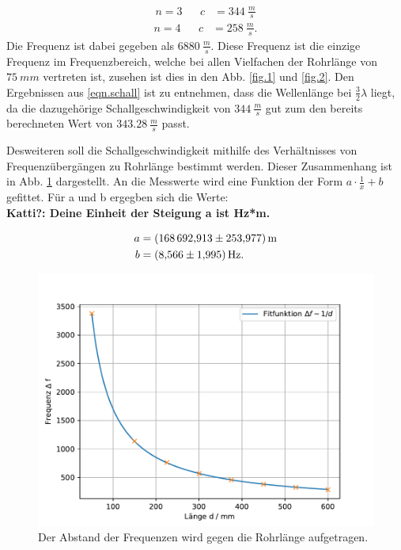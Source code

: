 \begin{align}
  n=3&&  c&=\SI{344}{\frac{m}{s}}
  \label{eqn.schall}
\end{align}
\begin{align*}
  n=4&&  c&=\SI{258}{\frac{m}{s}}.
\end{align*}
Die Frequenz ist dabei gegeben als $\SI{6880}{\frac{m}{s}}$.
Diese Frequenz ist die einzige Frequenz im Frequenzbereich, welche bei allen Vielfachen der Rohrlänge von $\SI{75}{mm}$ vertreten ist,
zusehen ist dies in den Abb. \ref{fig.1} und \ref{fig.2}.
Den Ergebnissen aus \ref{eqn.schall} ist zu entnehmen, dass die Wellenlänge bei $\frac{3}{2}\lambda$ liegt, da die dazugehörige Schallgeschwindigkeit von $\SI{344}{\frac{m}{s}}$ gut zum den bereits berechneten Wert von $\SI{343.28}{\frac{m}{s}}$ passt.

\FloatBarrier
Desweiteren soll die Schallgeschwindigkeit mithilfe des Verhältnisses von Frequenzübergängen zu Rohrlänge bestimmt werden.
Dieser Zusammenhang ist in Abb. \ref{fig.1/x} dargestellt.
An die Messwerte wird eine Funktion der Form $a\cdot\frac{1}{x}+b$ gefittet.
Für a und b ergegben sich die Werte:
\\\textbf{\huge{Katti?: Deine Einheit der Steigung a ist Hz*m.}}

\begin{align*}
  a&=\SI{168692.913\pm253.977}{m}\\
  b&=\SI{8.566\pm1.995}{Hz}.\\
\end{align*}
\begin{figure}[h!]
  \centering
  \includegraphics[width=\textwidth]{geschi.pdf}
  \caption{Der Abstand der Frequenzen wird gegen die Rohrlänge aufgetragen.}
  \label{fig.1/x}
\end{figure}
\FloatBarrier

